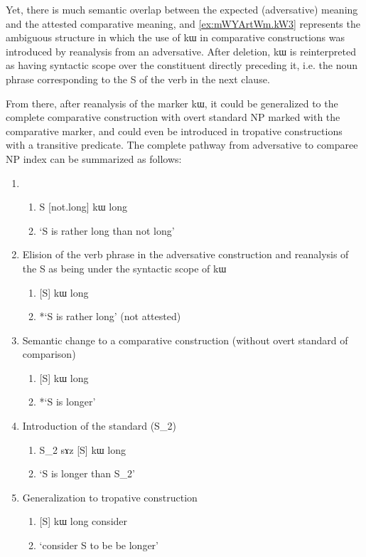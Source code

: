 \documentclass[oldfontcommands,oneside,a4paper,11pt]{article}
\newcommand{\ipa}[1]{{\phon #1}} %
\begin{document}
  
  Yet, there is much semantic overlap   between the expected (adversative) meaning and the attested comparative meaning, and \ref{ex:mWYArtWm.kW3}   represents the ambiguous structure in which the use of \ipa{kɯ} in comparative constructions was introduced by reanalysis from an adversative. After deletion, \ipa{kɯ} is reinterpreted as having syntactic scope over the constituent directly preceding it, i.e. the noun phrase corresponding to the S of the verb in the next clause.
  
  From there, after reanalysis of the marker \ipa{kɯ}, it could be generalized to the complete comparative construction with overt standard NP marked with the comparative marker, and could even be introduced in tropative constructions with a transitive predicate. The complete pathway from adversative to comparee NP index can be summarized as follows:
  
\begin{enumerate} 
\item 
\begin{enumerate} 
\item S [not.long] \ipa{kɯ} long 
\item `S is rather long than not long'
\end{enumerate} 
\item Elision of the verb phrase in the adversative construction  and reanalysis of the S as being under the syntactic scope of \ipa{kɯ}
\begin{enumerate} 
\item{} [S] \ipa{kɯ} long  
\item *`S is rather long' (not attested)
\end{enumerate} 
\item Semantic change to a comparative construction (without overt standard of comparison)
\begin{enumerate} 
\item{} [S] \ipa{kɯ} long  
\item *`S is longer'  
\end{enumerate} 
\item Introduction of the standard (S_2)
\begin{enumerate} 
\item{} S_2 \ipa{sɤz} [S] \ipa{kɯ} long  
\item  `S is longer than S_2'
\end{enumerate} 
\item Generalization to tropative construction
\begin{enumerate} 
\item{}  [S] \ipa{kɯ} long  consider  
\item  `consider S to be be longer'
\end{enumerate} 
 
\end{enumerate}
  
\end{document}
